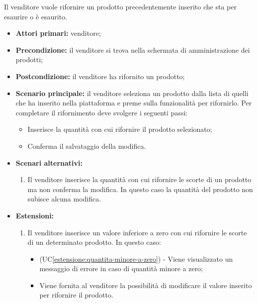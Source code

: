 \label{rifornimento-prodotto}

Il venditore vuole rifornire un prodotto precedentemente inserito che sta per esaurire o è esaurito.
\begin{itemize}
    \item \textbf{Attori primari:} venditore;
    \item \textbf{Precondizione:} il venditore si trova nella schermata di amministrazione dei prodotti;
    \item \textbf{Postcondizione:} il venditore ha rifornito un prodotto;
    \item \textbf{Scenario principale:} il venditore seleziona un prodotto dalla lista di quelli che ha inserito nella piattaforma e preme sulla funzionalità per rifornirlo. Per completare il rifornimento deve svolgere i seguenti passi:
    \begin{itemize}
        \item Inserisce la quantità con cui rifornire il prodotto selezionato;
        \item Conferma il salvataggio della modifica.
    \end{itemize}
	\item \textbf{Scenari alternativi:}
	\begin{enumerate}[label=\lett]
		\item Il venditore inserisce la quantità con cui rifornire le scorte di un prodotto ma non conferma la modifica. In questo caso la quantità del prodotto non subisce alcuna modifica.
	\end{enumerate}
	\item \textbf{Estensioni:}
	\begin{enumerate}[label=\lett]
		\item Il venditore inserisce un valore inferiore a zero con cui rifornire le scorte di un determinato prodotto. In questo caso:
		\begin{itemize}
			\item (UC\ref{estensione:quantita-minore-a-zero}) - Viene visualizzato un messaggio di errore in caso di quantità minore a zero;
			\item Viene fornita al venditore la possibilità di modificare il valore inserito per rifornire il prodotto.
		\end{itemize}
	\end{enumerate}
\end{itemize}

\label{ricerca-prodotti-venditore}

